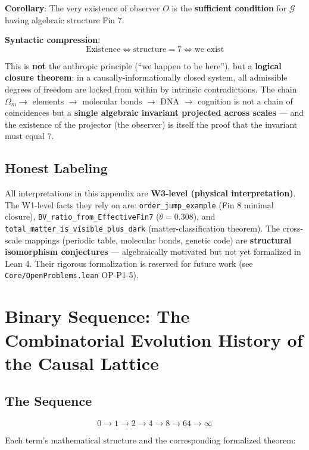 \documentclass[aps,prd,twocolumn,nofootinbib,floatfix]{revtex4-2}
\begin{document}
\textbf{Corollary}: The very existence of observer $O$ is the \textbf{sufficient condition} for $\mathcal{G}$ having algebraic structure Fin 7.

\textbf{Syntactic compression}:
\[
\boxed{\text{Existence} \iff \text{structure}=7 \iff \text{we exist}}
\]

This is \textbf{not} the anthropic principle (``we happen to be here''), but a \textbf{logical closure theorem}: in a causally-informationally closed system, all admissible degrees of freedom are locked from within by intrinsic contradictions. The chain $\Omega_m \to$ elements $\to$ molecular bonds $\to$ DNA $\to$ cognition is not a chain of coincidences but a \textbf{single algebraic invariant projected across scales} --- and the existence of the projector (the observer) is itself the proof that the invariant must equal 7.

\subsection{Honest Labeling}

All interpretations in this appendix are \textbf{W3-level (physical interpretation)}. The W1-level facts they rely on are: \texttt{order\_jump\_example} (Fin 8 minimal closure), \texttt{BV\_ratio\_from\_EffectiveFin7} ($\theta = 0.308$), and \texttt{total\_matter\_is\_visible\_plus\_dark} (matter-classification theorem). The cross-scale mappings (periodic table, molecular bonds, genetic code) are \textbf{structural isomorphism conjectures} --- algebraically motivated but not yet formalized in Lean 4. Their rigorous formalization is reserved for future work (see \texttt{Core/OpenProblems.lean} OP-P1-5).

\section{Binary Sequence: The Combinatorial Evolution History of the Causal Lattice}

\subsection{The Sequence}

\[
\boxed{
0 \longrightarrow 1 \longrightarrow 2 \longrightarrow 4 \longrightarrow 8 \longrightarrow 64 \longrightarrow \infty
}
\]

Each term's mathematical structure and the corresponding formalized theorem:
\end{document}
